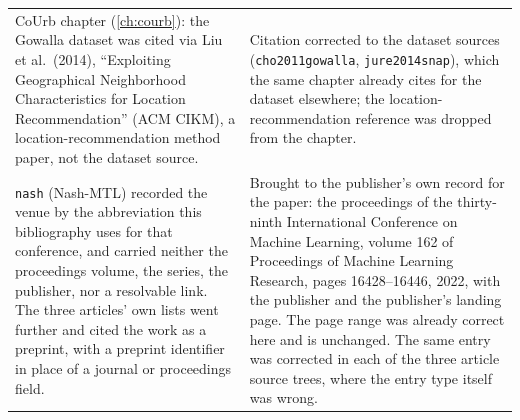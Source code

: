 {\begin{longtable}{@{}p{}p{}@{}}
\addlinespace
CoUrb chapter (\ref{ch:courb}): the Gowalla dataset was cited via Liu et al.\ (2014),
``Exploiting Geographical Neighborhood Characteristics for Location Recommendation''
(ACM CIKM), a location-recommendation method paper, not the dataset source. &
Citation corrected to the dataset sources (\texttt{cho2011gowalla},
\texttt{jure2014snap}), which the same chapter already cites for the dataset
elsewhere; the location-recommendation reference was dropped from the chapter. \\
\addlinespace
\texttt{nash} (Nash-MTL) recorded the venue by the abbreviation this bibliography uses for
that conference, and carried neither the proceedings volume, the series, the publisher, nor
a resolvable link. The three articles' own lists went further and cited the work as a
preprint, with a preprint identifier in place of a journal or proceedings field. &
Brought to the publisher's own record for the paper: the proceedings of the thirty-ninth
International Conference on Machine Learning, volume 162 of Proceedings of Machine Learning
Research, pages 16428--16446, 2022, with the publisher and the publisher's landing page. The
page range was already correct here and is unchanged. The same entry was corrected in each of
the three article source trees, where the entry type itself was wrong. \\
\end{longtable}
}
